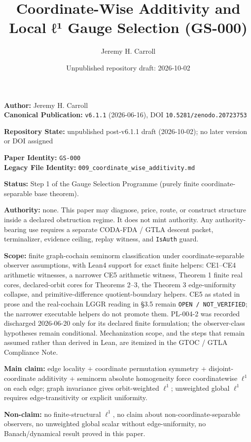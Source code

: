 \documentclass[
  11pt,
]{article}
\title{Coordinate-Wise Additivity and Local ℓ¹ Gauge Selection (GS-000)}
\author{Jeremy H. Carroll}
\date{Unpublished repository draft: 2026-10-02}
\begin{document}
\maketitle
\textbf{Author:} Jeremy H. Carroll\\
\textbf{Canonical Publication:} \texttt{v6.1.1} (2026-06-16), DOI
\texttt{10.5281/\allowbreak{}zenodo.20723753}

\textbf{Repository State:} unpublished post-v6.1.1 draft (2026-10-02);
no later version or DOI assigned

\textbf{Paper Identity:} \texttt{GS-\allowbreak{}000}\\
\textbf{Legacy File Identity:}
\texttt{009\_\allowbreak{}coordinate\_\allowbreak{}wise\_\allowbreak{}additivity.md}

\textbf{Status:} Step 1 of the Gauge Selection Programme (purely finite
coordinate-separable base theorem).

\textbf{Authority:} none. This paper may diagnose, price, route, or
construct structure inside a declared obstruction regime. It does not
mint authority. Any authority-bearing use requires a separate CODA-FDA /
GTLA descent packet, terminalizer, evidence ceiling, replay witness, and
\texttt{IsAuth} guard.

\textbf{Scope:} finite graph-cochain seminorm classification under
coordinate-separable observer assumptions, with Lean4 support for exact
finite helpers: CE1--CE4 arithmetic witnesses, a narrower CE5 arithmetic
witness, Theorem 1 finite real cores, declared-orbit cores for Theorems
2--3, the Theorem 3 edge-uniformity collapse, and primitive-difference
quotient-boundary helpers. CE5 as stated in prose and the real-cochain
LGGR reading in §3.5 remain
\texttt{OPEN /\allowbreak{} NOT\_\allowbreak{}VERIFIED}; the narrower
executable helpers do not promote them. PL-004-2 was recorded discharged
2026-06-20 only for its declared finite formulation; the observer-class
hypotheses remain conditional. Mechanization scope, and the steps that
remain assumed rather than derived in Lean, are itemized in the GTOC /
GTLA Compliance Note.

\textbf{Main claim:} edge locality + coordinate permutation symmetry +
disjoint-coordinate additivity + seminorm absolute homogeneity force
coordinatewise \(\ell^1\) on each edge; graph invariance gives
orbit-weighted \(\ell^1\); unweighted global \(\ell^1\) requires
edge-transitivity or explicit uniformity.

\textbf{Non-claim:} no finite-structural \(\ell^1\), no claim about
non-coordinate-separable observers, no unweighted global scalar without
edge-uniformity, no Banach/dynamical result proved in this paper.
\end{document}
